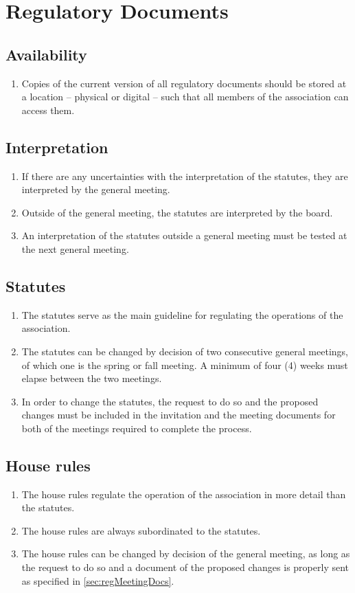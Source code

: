 \section*{Regulatory Documents}
\subsection{Availability}
\begin{enumerate}
  \item Copies of the current version of all regulatory documents should be stored at a location – physical or digital – such that all members of the association can access them.
\end{enumerate}

\subsection{Interpretation}
\begin{enumerate}
  \item If there are any uncertainties with the interpretation of the statutes, they are interpreted by the general meeting. 
  \item Outside of the general meeting, the statutes are interpreted by the board. 
  \item An interpretation of the statutes outside a general meeting must be tested at the next general meeting. 
\end{enumerate}

\subsection{Statutes}
\begin{enumerate}
  \item The statutes serve as the main guideline for regulating the operations of the association.
  \item The statutes can be changed by decision of two consecutive general meetings, of which one is the spring or fall meeting. A minimum of four (4) weeks must elapse between the two meetings.
  \item In order to change the statutes, the request to do so and the proposed changes must be included in the invitation and the meeting documents for both of the meetings required to complete the process.   
\end{enumerate}

\subsection{House rules}
\begin{enumerate}
  \item The house rules regulate the operation of the association in more detail than the statutes. 
  \item The house rules are always subordinated to the statutes.
  \item The house rules can be changed by decision of the general meeting, as long as the request to do so and a document of the proposed changes is properly sent as specified in \ref{sec:regMeetingDocs}.
\end{enumerate}

